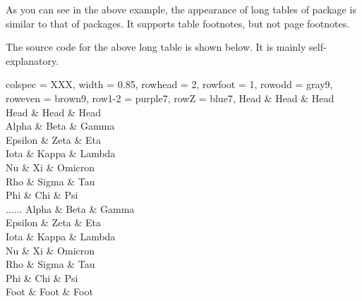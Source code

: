 \documentclass[oneside]{book}
\begin{document}
As you can see in the above example, the appearance of long tables of  package
is similar to that of  packages.
It supports table footnotes, but not page footnotes.

\newpage

The source code for the above long table is shown below. It is mainly self-explanatory.

\begin{codehigh}
\begin{longtblr}[
  theme = fancy,
  caption = {A Long Long Long Long Long Long Long Table},
  entry = {Short Caption},
  label = {tblr:test},
  note{a} = {It is the first footnote.},
  note{$\dag$} = {It is the second long long long long long long footnote.},
  remark{Note} = {Some general note. Some general note. Some general note.},
  remark{Source} = {Made up by myself. Made up by myself. Made up by myself.},
]{
  colspec = {XXX}, width = 0.85\linewidth,
  rowhead = 2, rowfoot = 1,
  row{odd} = {gray9}, row{even} = {brown9},
  row{1-2} = {purple7}, row{Z} = {blue7},
}
\hline
 Head    & Head  & Head    \\
\hline
 Head    & Head  & Head    \\
\hline
 Alpha   & Beta  & Gamma   \\
\hline
 Epsilon & Zeta       & Eta    \\
\hline
 Iota    & Kappa\TblrNote{$\dag$} & Lambda \\
\hline
 Nu      & Xi    & Omicron \\
\hline
 Rho     & Sigma & Tau     \\
\hline
 Phi     & Chi   & Psi     \\
\hline
......
\hline
 Alpha   & Beta  & Gamma   \\
\hline
 Epsilon & Zeta  & Eta     \\
\hline
 Iota    & Kappa & Lambda  \\
\hline
 Nu      & Xi    & Omicron \\
\hline
 Rho     & Sigma & Tau     \\
\hline
 Phi     & Chi   & Psi     \\
\hline
 Foot    & Foot  & Foot    \\
\hline
\end{longtblr}
\end{codehigh}
\end{document}
